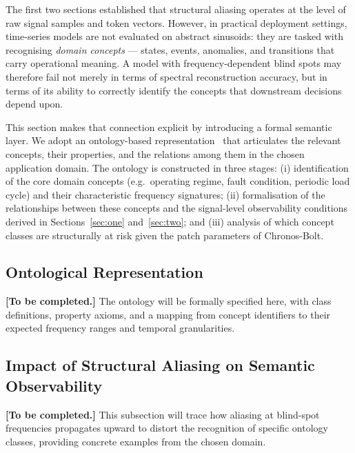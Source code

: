 The first two sections established that structural aliasing operates at the level of raw signal samples and token vectors.
However, in practical deployment settings, time-series models are not evaluated on abstract sinusoids: they are tasked with recognising \emph{domain concepts} — states, events, anomalies, and transitions that carry operational meaning.
A model with frequency-dependent blind spots may therefore fail not merely in terms of spectral reconstruction accuracy, but in terms of its ability to correctly identify the concepts that downstream decisions depend upon.

This section makes that connection explicit by introducing a formal semantic layer.
We adopt an ontology-based representation~\cite{voitaInformationTheoreticProbingMinimum2020} that articulates the relevant concepts, their properties, and the relations among them in the chosen application domain.
The ontology is constructed in three stages: (i) identification of the core domain concepts (e.g.\ operating regime, fault condition, periodic load cycle) and their characteristic frequency signatures; (ii) formalisation of the relationships between these concepts and the signal-level observability conditions derived in Sections~\ref{sec:one} and~\ref{sec:two}; and (iii) analysis of which concept classes are structurally at risk given the patch parameters of Chronos-Bolt.

\subsection{Ontological Representation}

\noindent\textbf{[To be completed.]}
The ontology will be formally specified here, with class definitions, property axioms, and a mapping from concept identifiers to their expected frequency ranges and temporal granularities.

\subsection{Impact of Structural Aliasing on Semantic Observability}

\noindent\textbf{[To be completed.]}
This subsection will trace how aliasing at blind-spot frequencies propagates upward to distort the recognition of specific ontology classes, providing concrete examples from the chosen domain.
